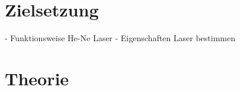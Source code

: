 \section{Zielsetzung}
\label{sec:Zielsetzung}
- Funktionsweise He-Ne Laser
- Eigenschaften Laser bestimmen

\section{Theorie}
\label{sec:Theorie}
\cite{anleitungV61}
\cite{laser}
\cite{photonics}
\cite{laserspektroskopie}

